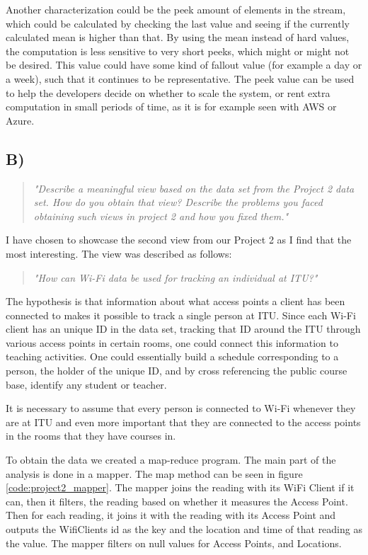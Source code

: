 \newpar Another characterization could be the peek amount of elements in the stream, which could be calculated by checking the last value and seeing if the currently calculated mean is higher than that. By using the mean instead of hard values, the computation is less sensitive to very short peeks, which might or might not be desired. This value could have some kind of fallout value (for example a day or a week), such that it continues to be representative. The peek value can be used to help the developers decide on whether to scale the system, or rent extra computation in small periods of time, as it is for example seen with AWS or Azure.

\subsection{B)}
\begin{quote}
		\textit{"Describe	a	meaningful	view	based	on	the	data	set	from	the	Project	2	data	set.	How	do	you	obtain	that	view?	Describe	the	problems	you	faced	obtaining	such	views	in	project	2	and	how	you	fixed	them."}
\end{quote}
I have chosen to showcase the second view from our Project 2 as I find that the most interesting. The view was described as follows: 
\begin{quote}
	\textit{"How can Wi-Fi data be used for tracking an individual at ITU?"}
\end{quote}
The hypothesis is that information about what access points a client has been connected to makes it possible to track a single person at ITU. Since each Wi-Fi client has an unique ID in the data set, tracking that ID around the ITU through various access points in certain rooms, one could connect this information to teaching activities. One could essentially build a schedule corresponding to a person, the holder of the unique ID, and by cross referencing the public course base, identify any student or teacher. 

It is necessary to assume that every person is connected to Wi-Fi whenever they are at ITU and even more important that they are connected to the access points in the rooms that they have courses in. 

\newpar To obtain the data we created a map-reduce program. The main part of the analysis is done in a mapper. The map method can be seen in figure \ref{code:project2_mapper}. The mapper joins the reading with its WiFi Client if it can, then it filters, the reading based on whether it measures the Access Point. Then for each reading, it joins it with the reading with its Access Point  and outputs the WifiClients id as the key and the location and time of that reading as the value. The mapper filters on null values for Access Points, and Locations.

